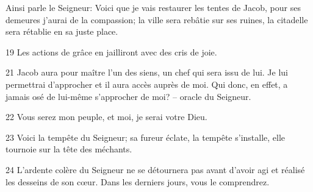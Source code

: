 Ainsi parle le Seigneur: Voici que je vais restaurer les tentes de Jacob, pour ses demeures j’aurai de la compassion; la ville sera rebâtie sur ses ruines, la citadelle sera rétablie en sa juste place.

19 Les actions de grâce en jailliront avec des cris de joie. 

21 Jacob aura pour maître l’un des siens, un chef qui sera issu de lui. Je lui permettrai d’approcher et il aura accès auprès de moi. Qui donc, en effet, a jamais osé de lui-même s’approcher de moi? – oracle du Seigneur.

22 Vous serez mon peuple, et moi, je serai votre Dieu.

23 Voici la tempête du Seigneur; sa fureur éclate, la tempête s’installe, elle tournoie sur la tête des méchants.

24 L’ardente colère du Seigneur ne se détournera pas avant d’avoir agi et réalisé les desseins de son cœur. Dans les derniers jours, vous le comprendrez.